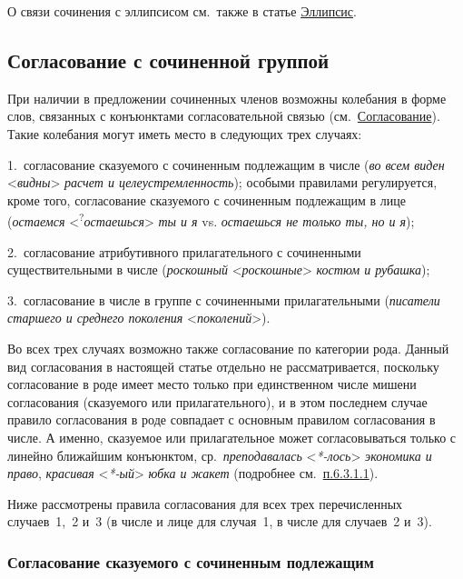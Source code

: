 О связи сочинения с эллипсисом см.~также в статье \underline{Эллипсис}.

\subsection{Согласование с сочиненной
  группой}\label{ux441ux43eux433ux43bux430ux441ux43eux432ux430ux43dux438ux435-ux441-ux441ux43eux447ux438ux43dux435ux43dux43dux43eux439-ux433ux440ux443ux43fux43fux43eux439}

При наличии в предложении сочиненных членов возможны колебания в форме
слов, связанных с конъюнктами согласовательной связью
(см.~\underline{Согласование}). Такие колебания могут иметь место в
следующих трех случаях:

1.~согласование сказуемого с сочиненным подлежащим в числе (\textit{во
  всем виден} \textless{}\textit{видны}\textgreater{} \textit{расчет и
  целеустремленность}); особыми правилами регулируется, кроме того,
согласование сказуемого с сочиненным подлежащим в лице (\textit{остаемся}
\textless{}\textsuperscript{?}\textit{остаешься}\textgreater{} \textit{ты и
  я} vs. \textit{остаешься не только ты, но и я});

2.~согласование атрибутивного прилагательного с сочиненными
существительными в числе (\textit{роскошный}
\textless{}\textit{роскошные}\textgreater{} \textit{костюм и рубашка});

3.~согласование в числе в группе с сочиненными прилагательными
(\textit{писатели старшего и среднего поколения}
\textless{}\textit{поколений}\textgreater).

Во всех трех случаях возможно также согласование по категории рода.
Данный вид согласования в настоящей статье отдельно не рассматривается,
поскольку согласование в роде имеет место только при единственном числе
мишени согласования (сказуемого или прилагательного), и в этом последнем
случае правило согласования в роде совпадает с основным правилом
согласования в числе. А именно, сказуемое или прилагательное может
согласовываться только с линейно ближайшим конъюнктом,
ср.~\textit{преподавалась} \textless{}\textit{*-лось}\textgreater{}
\textit{экономика и право}, \textit{красивая}
\textless{}\textit{*-ый}\textgreater{} \textit{юбка и жакет} (подробнее
см.~\underline{п.6.3.1.1}).

Ниже рассмотрены правила согласования для всех трех перечисленных
случаев~1,~2 и~3 (в числе и лице для случая~1, в числе для случаев~2
и~3).

\subsubsection{Согласование сказуемого с сочиненным
  подлежащим}\label{ux441ux43eux433ux43bux430ux441ux43eux432ux430ux43dux438ux435-ux441ux43aux430ux437ux443ux435ux43cux43eux433ux43e-ux441-ux441ux43eux447ux438ux43dux435ux43dux43dux44bux43c-ux43fux43eux434ux43bux435ux436ux430ux449ux438ux43c}

